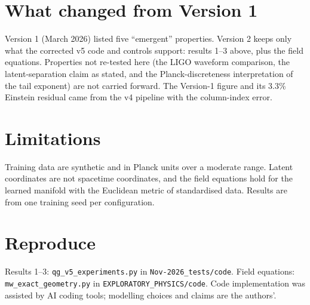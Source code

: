 \documentclass[10pt,twocolumn]{article}
\begin{document}
\section{What changed from Version 1}
Version 1 (March 2026) listed five ``emergent'' properties. Version 2 keeps only what the corrected
v5 code and controls support: results 1--3 above, plus the field equations. Properties not
re-tested here (the LIGO waveform comparison, the latent-separation claim as stated, and the
Planck-discreteness interpretation of the tail exponent) are not carried forward. The Version-1
figure and its 3.3\% Einstein residual came from the v4 pipeline with the column-index error.



\section{Limitations}
Training data are synthetic and in Planck units over a moderate range. Latent coordinates are not
spacetime coordinates, and the field equations hold for the learned manifold with the Euclidean
metric of standardised data. Results are from one training seed per configuration.

\section*{Reproduce}
\small Results 1--3: \texttt{qg\_v5\_experiments.py} in \texttt{Nov-2026\_tests/code}.
Field equations: \texttt{mw\_exact\_geometry.py} in \texttt{EXPLORATORY\_PHYSICS/code}. Code
implementation was assisted by AI coding tools; modelling choices and claims are the authors'.
\end{document}
